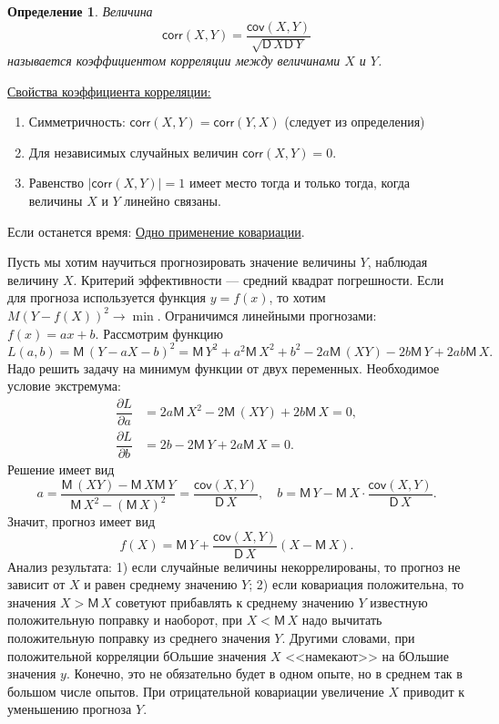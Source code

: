 \documentclass[12pt]{article}
\newtheorem{definition}{Определение}
\newcommand{\M}{{\mathsf M}\,}
\newcommand{\cov}{\mathsf{cov}}
\newcommand{\corr}{\mathsf{corr}}
\newcommand{\var}{\mathsf{D}\,}
\begin{document}
\begin{definition}
  Величина 
  \[
  \corr(X,Y)=\dfrac{\cov(X,Y)}{\sqrt{\var X \var Y}}
  \]
  называется \emph{коэффициентом корреляции} между величинами $X$ и $Y$.
\end{definition}

\underline{Свойства коэффициента корреляции:}
\begin{enumerate}
\item Симметричность: $\corr(X,Y)=\corr(Y,X)$ (следует из определения)
\item Для независимых случайных величин $\corr(X,Y)=0$.
\item Равенство $|\corr(X,Y)|=1$ имеет место тогда и только тогда, когда величины $X$ и
  $Y$ линейно связаны.
\end{enumerate}



Если останется время:
\underline{Одно применение ковариации}.\par
Пусть мы хотим научиться прогнозировать значение величины $Y$, наблюдая величину
$X$. Критерий эффективности --- средний квадрат погрешности. Если для прогноза
используется функция $y=f(x)$, то хотим $M(Y-f(X))^2\to\min$. Ограничимся линейными
прогнозами:
$f(x)=ax+b$. Рассмотрим функцию 
$$
L(a,b)=\M(Y-aX-b)^2 = \M Y^2+a^2\M X^2 + b^2
-2a\M(XY)-2b\M Y + 2ab \M X.$$
Надо решить задачу на минимум функции от двух переменных. Необходимое условие экстремума:
\begin{align*}
  \dfrac{\partial L}{\partial a} & = 2a\M X^2-2\M(XY)+2b\M X=0,\\
  \dfrac{\partial L}{\partial b} & = 2b-2\M Y+2a\M X=0.
\end{align*}
Решение имеет вид
\[
a=\dfrac{\M(XY)-\M X \M Y}{\M X^2-(\M X)^2} = \dfrac{\cov(X,Y)}{\var X}, \quad
b = \M Y - \M X \cdot \dfrac{\cov(X,Y)}{\var X}.
\]
Значит, прогноз имеет вид
\[
f(X)=\M Y+ \dfrac{\cov(X,Y)}{\var X}(X-\M X).
\]
Анализ результата: 1) если случайные величины некоррелированы, то прогноз не зависит от
$X$ и равен среднему значению $Y$; 2) если ковариация положительна, то значения $X>\M X$
советуют прибавлять к среднему значению $Y$ известную положительную поправку и наоборот,
при $X<\M X$ надо вычитать положительную поправку из среднего значения $Y$. Другими
словами, при положительной корреляции бОльшие значения $X$ <<намекают>> на бОльшие
значения $y$. Конечно, это не обязательно будет в одном опыте, но в среднем так в большом
числе опытов. При отрицательной ковариации увеличение $X$ приводит к уменьшению прогноза $Y$.
\end{document}
